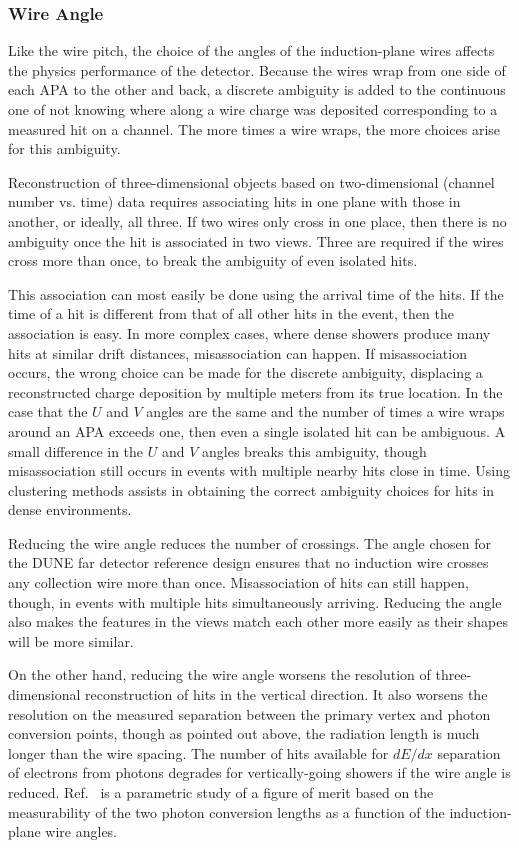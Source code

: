 \subsubsection{Wire Angle}

Like the wire pitch, the choice of the angles of the induction-plane wires affects the
physics performance of the detector.  Because the wires wrap from one side of each APA
to the other and back, a discrete ambiguity is added to the continuous one of not knowing
where along a wire charge was deposited corresponding to a measured hit on a channel.
The more times a wire wraps, the more choices arise for this ambiguity.

Reconstruction of three-dimensional objects based on two-dimensional (channel number vs. time)
data requires associating hits in one plane with those in another, or ideally, all three.
If two wires only cross in one place, then there is no ambiguity once the hit is associated
in two views.  Three are required if the wires cross more than once, to break the ambiguity
of even isolated hits.

This association can most easily be done using the arrival time of the hits.  If the time of
a hit is different from that of all other hits in the event, then the association is easy.
In more complex cases, where dense showers produce many hits at similar drift distances,
misassociation can happen.  If misassociation occurs, the wrong choice can be made for
the discrete ambiguity, displacing a reconstructed charge deposition
by multiple meters from its true location.  In the case that the $U$ and $V$ angles are the
same and the number of times a wire wraps around an APA exceeds one, then even a single isolated
hit can be ambiguous.  A small difference in the $U$ and $V$ angles breaks this ambiguity,
though misassociation still occurs in events with multiple nearby hits close in time.
Using clustering methods assists in obtaining the correct ambiguity choices for hits in
dense environments.

Reducing the wire angle reduces the number of crossings.  The angle chosen for the DUNE
far detector reference design ensures that no induction wire crosses any collection wire
more than once.  Misassociation of hits can still happen, though, in events with multiple
hits simultaneously arriving.  Reducing the angle also makes the features in the views
match each other more easily as their shapes will be more similar.

On the other hand, reducing the wire angle worsens the resolution of three-dimensional
reconstruction of hits in the vertical direction.  It also worsens the resolution on the
measured separation between the primary vertex and photon conversion points, though as pointed
out above, the radiation length is much longer than the wire spacing.  The number of hits
available for $dE/dx$ separation of electrons from photons degrades for vertically-going
showers if the wire angle is reduced.  Ref.~\cite{wire-orientation} is a parametric
study of a figure of merit based on the measurability of the two photon conversion
lengths as a function of the induction-plane wire angles.

